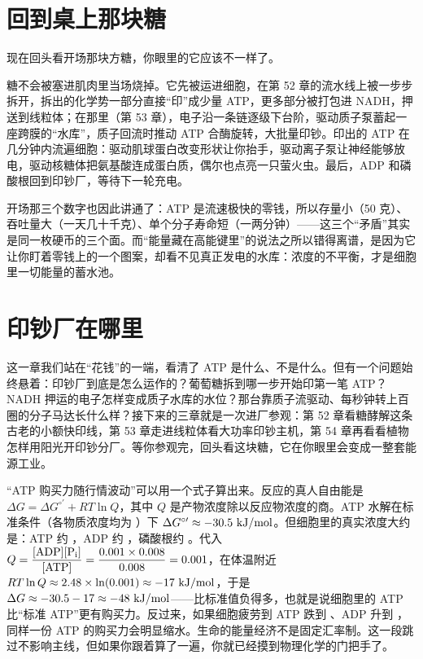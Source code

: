 \section{回到桌上那块糖}

现在回头看开场那块方糖，你眼里的它应该不一样了。

糖不会被塞进肌肉里当场烧掉。它先被运进细胞，在第 52 章的流水线上被一步步拆开，拆出的化学势一部分直接“印”成少量 ATP，更多部分被打包进 NADH，押送到线粒体；在那里（第 53 章），电子沿一条链逐级下台阶，驱动质子泵蓄起一座跨膜的“水库”，质子回流时推动 ATP 合酶旋转，大批量印钞。印出的 ATP 在几分钟内流遍细胞：驱动肌球蛋白改变形状让你抬手，驱动离子泵让神经能够放电，驱动核糖体把氨基酸连成蛋白质，偶尔也点亮一只萤火虫。最后，ADP 和磷酸根回到印钞厂，等待下一轮充电。

开场那三个数字也因此讲通了：ATP 是流速极快的零钱，所以存量小（50 克）、吞吐量大（一天几十千克）、单个分子寿命短（一两分钟）——这三个“矛盾”其实是同一枚硬币的三个面。而“能量藏在高能键里”的说法之所以错得离谱，是因为它让你盯着零钱上的一个图案，却看不见真正发电的水库：浓度的不平衡，才是细胞里一切能量的蓄水池。

\section{印钞厂在哪里}

这一章我们站在“花钱”的一端，看清了 ATP 是什么、不是什么。但有一个问题始终悬着：印钞厂到底是怎么运作的？葡萄糖拆到哪一步开始印第一笔 ATP？NADH 押运的电子怎样变成质子水库的水位？那台靠质子流驱动、每秒钟转上百圈的分子马达长什么样？接下来的三章就是一次进厂参观：第 52 章看糖酵解这条古老的小额快印线，第 53 章走进线粒体看大功率印钞主机，第 54 章再看看植物怎样用阳光开印钞分厂。等你参观完，回头看这块糖，它在你眼里会变成一整套能源工业。

\begin{tiaozhan}
“ATP 购买力随行情波动”可以用一个式子算出来。反应的真人自由能是 $\Delta G = \Delta G^{\circ\prime} + RT\ln Q$，其中 $Q$ 是产物浓度除以反应物浓度的商。ATP 水解在标准条件（各物质浓度均为 ）下 $\Delta G^{\circ\prime} \approx -30.5\ \mathrm{kJ/mol}$。但细胞里的真实浓度大约是：ATP 约 ，ADP 约 ，磷酸根约 。代入 $Q = \dfrac{[\mathrm{ADP}][\mathrm{P_i}]}{[\mathrm{ATP}]} = \dfrac{0.001 \times 0.008}{0.008} = 0.001$，在体温附近 $RT\ln Q \approx 2.48 \times \ln(0.001) \approx -17\ \mathrm{kJ/mol}$，于是 $\Delta G \approx -30.5 - 17 \approx -48\ \mathrm{kJ/mol}$——比标准值负得多，也就是说细胞里的 ATP 比“标准 ATP”更有购买力。反过来，如果细胞疲劳到 ATP 跌到 、ADP 升到 ，同样一份 ATP 的购买力会明显缩水。生命的能量经济不是固定汇率制。这一段跳过不影响主线，但如果你跟着算了一遍，你就已经摸到物理化学的门把手了。
\end{tiaozhan}

